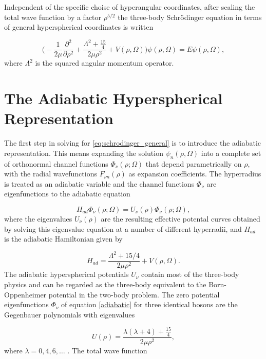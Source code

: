 Independent of the specific choise of hyperangular coordinates, after scaling the total wave function by a factor $\rho^{5/2}$ the three-body Schr{\"o}dinger equation in terms of general hyperspherical coordinates is written

\begin{equation}\label{eq:schrodinger_general}
\bigg(-\frac{1}{2 \mu}\frac{\partial^2}{\partial \rho^2} + \frac{ \Lambda^2 + \frac{15}{4}}{2 \mu \rho^{2}}+ V(\rho,\Omega)\bigg)\psi(\rho,\Omega) = E\psi(\rho,\Omega),
\end{equation}
where $\Lambda^2$ is the squared angular momentum operator.

\section{The Adiabatic Hyperspherical Representation}\label{sec:AHM}
The first step in solving for \eqref{eq:schrodinger_general} is to introduce the adiabatic representation. This means expanding the solution $\psi_{n}(\rho,\Omega)$ into a complete set of orthonormal channel functions $\Phi_{\nu}(\rho;\Omega)$ that depend parametrically on $\rho$, with the radial wavefunctions $F_{\nu n}(\rho)$ as expansion coefficients. The hyperradius is treated as an adiabatic variable and the channel functions $\Phi_{\nu}$ are eigenfunctions to the adiabatic equation

\begin{equation}\label{adiabatic}
H_{ad}\Phi_{\nu}{(\rho;\Omega)} = U_{\nu}{(\rho)}\Phi_{\nu}(\rho;\Omega), 
\end{equation}
where the eigenvalues $U_{\nu}(\rho)$ are the resulting effective potental curves obtained by solving this eigenvalue equation at a number of different hyperradii, and $H_{ad}$ is the adiabatic Hamiltonian given by

\begin{equation}
H_{ad} = \frac{\Lambda^2+15/4}{2 \mu \rho^2} + V(\rho,\Omega).
\end{equation}
The adiabatic hyperspherical potentials $U_{\nu}$ contain most of the three-body physics and can be regarded as the three-body equivalent to the Born-Oppenheimer potential in the two-body problem. The zero potential eigenfunctions $\Phi_{\nu}$ of equation \eqref{adiabatic} for three identical bosons are the Gegenbauer polynomials with eigenvalues

\begin{equation}\label{eq:gegenbauer}
U(\rho) = \frac{\lambda(\lambda + 4) + \frac{15}{4}}{2\mu \rho^2},
\end{equation} 
where $\lambda = 0, 4, 6, \ldots$ \cite{Blume2002}.
The total wave function

